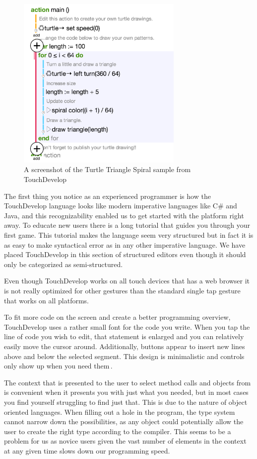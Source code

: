 \begin{figure}
	\centering
		\includegraphics[width=80mm]{diagrams/TouchDevelop_screenshot.png}
	\caption{A screenshot of the Turtle Triangle Spiral sample from
	TouchDevelop\,\cite{TouchDevelop:TurtleTriangleSpiral}}
\label{fig:TouchDevelop_screenshot}
\end{figure}

The first thing you notice as an experienced programmer is how the TouchDevelop language looks like modern imperative languages like C\# and Java, and this recognizability enabled us to get started with the platform right away. To educate new users there is a long tutorial that guides you through your first game. This tutorial makes the language seem very structured but in fact it is as easy to make syntactical error as in any other imperative language. We have placed TouchDevelop in this section of structured editors even though it should only be categorized as semi-structured.

Even though TouchDevelop works on all touch devices that has a web browser it is not really optimized for other gestures than the standard single tap gesture that works on all platforms.

To fit more code on the screen and create a better programming overview, TouchDevelop uses a rather small font for the code you write. When you tap the line of code you wish to edit, that statement is enlarged and you can relatively easily move the cursor around. Additionally, buttons appear to insert new lines above and below the selected segment. This design is minimalistic and controls only show up when you need them\,\cite{nielsen1990heuristic}.

The context that is presented to the user to select method calls and objects from is convenient when it presents you with just what you needed, but in most cases you find yourself struggling to find just that. This is due to the nature of object oriented languages. When filling out a hole in the program, the type system cannot narrow down the possibilities, as any object could potentially allow the user to create the right type according to the compiler. This seems to be a problem for us as novice users given the vast number of elements in the context at any given time slows down our programming speed.

